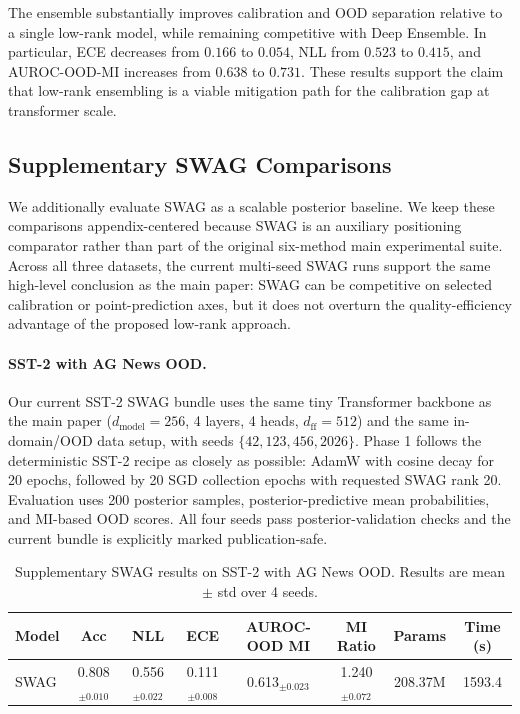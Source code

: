 \documentclass{article}
\theoremstyle{plain}
\theoremstyle{definition}
\theoremstyle{remark}
\begin{document}
The ensemble substantially improves calibration and OOD separation relative to a
single low-rank model, while remaining competitive with Deep Ensemble. In
particular, ECE decreases from $0.166$ to $0.054$, NLL from $0.523$ to $0.415$,
and AUROC-OOD-MI increases from $0.638$ to $0.731$. These results support the
claim that low-rank ensembling is a viable mitigation path for the calibration
gap at transformer scale.


\subsection{Supplementary SWAG Comparisons}
\label{app:swag_comparisons}

We additionally evaluate SWAG \cite{maddox2019swag} as a scalable posterior baseline. We keep these comparisons appendix-centered because SWAG is an auxiliary positioning comparator rather than part of the original six-method main experimental suite. Across all three datasets, the current multi-seed SWAG runs support the same high-level conclusion as the main paper: SWAG can be competitive on selected calibration or point-prediction axes, but it does not overturn the quality-efficiency advantage of the proposed low-rank approach.

\paragraph{SST-2 with AG News OOD.}
Our current SST-2 SWAG bundle uses the same tiny Transformer backbone as the main paper ($d_{\text{model}}=256$, 4 layers, 4 heads, $d_{\text{ff}}=512$) and the same in-domain/OOD data setup, with seeds $\{42,123,456,2026\}$. Phase 1 follows the deterministic SST-2 recipe as closely as possible: AdamW with cosine decay for 20 epochs, followed by 20 SGD collection epochs with requested SWAG rank 20. Evaluation uses 200 posterior samples, posterior-predictive mean probabilities, and MI-based OOD scores. All four seeds pass posterior-validation checks and the current bundle is explicitly marked publication-safe.

\begin{table}[t]
\centering
\caption{Supplementary SWAG results on SST-2 with AG News OOD. Results are mean $\pm$ std over 4 seeds.}
\label{tab:swag_sst2}
\small
\begin{tabular}{lccccccc}
\toprule
\textbf{Model} & \textbf{Acc} & \textbf{NLL} & \textbf{ECE} & \textbf{AUROC-OOD MI} & \textbf{MI Ratio} & \textbf{Params} & \textbf{Time (s)} \\
\midrule
SWAG & 0.808$_{\pm 0.010}$ & 0.556$_{\pm 0.022}$ & 0.111$_{\pm 0.008}$ & 0.613$_{\pm 0.023}$ & 1.240$_{\pm 0.072}$ & 208.37M & 1593.4 \\
\bottomrule
\end{tabular}
\end{table}
\end{document}
